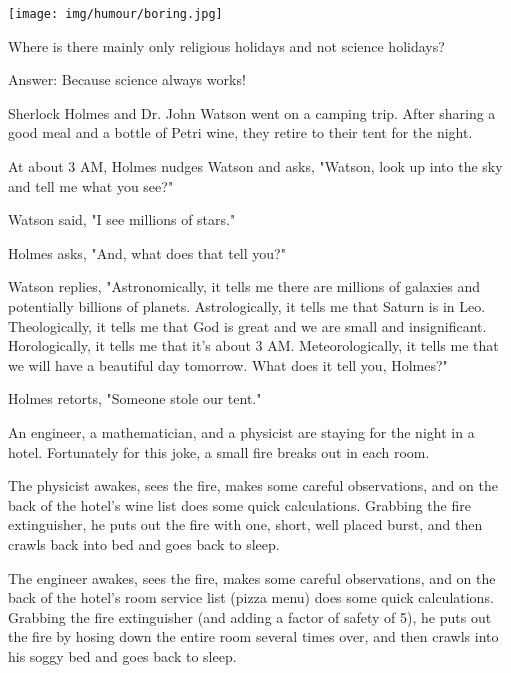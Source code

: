 	\begin{center}
		\texttt{[image: img/humour/boring.jpg]}	
	\end{center}
	
	\begin{center}\underline{\hspace{5 cm}}\end{center}

	Where is there mainly only religious holidays and not science holidays?
	
	Answer: Because science always works!
	
		
	
Sherlock Holmes and Dr. John Watson went on a camping trip. After sharing a good meal and a bottle of Petri wine, they retire to their tent for the night.

At about 3 AM, Holmes nudges Watson and asks, "Watson, look up into the sky and tell me what you see?"

Watson said, "I see millions of stars."

Holmes asks, "And, what does that tell you?"

Watson replies, "Astronomically, it tells me there are millions of galaxies and potentially billions of planets. Astrologically, it tells me that Saturn is in Leo. Theologically, it tells me that God is great and we are small and insignificant. Horologically, it tells me that it's about 3 AM. Meteorologically, it tells me that we will have a beautiful day tomorrow. What does it tell you, Holmes?"

Holmes retorts, "Someone stole our tent." 
	\begin{center}\underline{\hspace{5 cm}}\end{center}

An engineer, a mathematician, and a physicist are staying for the night in a hotel. Fortunately for this joke, a small fire breaks out in each room.

The physicist awakes, sees the fire, makes some careful observations, and on the back of the hotel's wine list does some quick calculations. Grabbing the fire extinguisher, he puts out the fire with one, short, well placed burst, and then crawls back into bed and goes back to sleep.

The engineer awakes, sees the fire, makes some careful observations, and on the back of the hotel's room service list (pizza menu) does some quick calculations. Grabbing the fire extinguisher (and adding a factor of safety of 5), he puts out the fire by hosing down the entire room several times over, and then crawls into his soggy bed and goes back to sleep.

